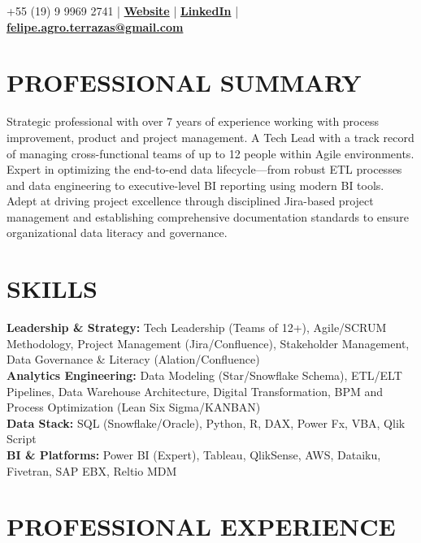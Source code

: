 \documentclass[9pt, letterpaper]{article}
\begin{document}
	\pagestyle{empty}
	
	 \hfill +55 (19) 9 9969 2741 | \href{https://feliperamiresterrazas.github.io/professionalwebsite/}{\textbf{Website}} | \href{https://www.linkedin.com/in/felipe-ramires-terrazas/}{\textbf{LinkedIn}} |
 \\
	 \hfill 	\href{mailto:felipe.agro.terrazas@gmail.com}{\textbf{felipe.agro.terrazas@gmail.com}}  
	
	\section*{PROFESSIONAL SUMMARY}
	\noindent Strategic professional with over 7 years of experience working with process improvement, product and project management. A Tech Lead with a track record of managing cross-functional teams of up to 12 people within Agile environments. Expert in optimizing the end-to-end data lifecycle—from robust ETL processes and data engineering to executive-level BI reporting using modern BI tools. Adept at driving project excellence through disciplined Jira-based project management and establishing comprehensive documentation standards to ensure organizational data literacy and governance.
	
	\section*{SKILLS}
	\noindent \textbf{Leadership \& Strategy:} Tech Leadership (Teams of 12+), Agile/SCRUM Methodology, Project Management (Jira/Confluence), Stakeholder Management, Data Governance \& Literacy (Alation/Confluence) \\
	\noindent \textbf{Analytics Engineering:} Data Modeling (Star/Snowflake Schema), ETL/ELT Pipelines, Data Warehouse Architecture, Digital Transformation, BPM and Process Optimization (Lean Six Sigma/KANBAN) \\
	\noindent \textbf{Data Stack:} SQL (Snowflake/Oracle), Python, R, DAX, Power Fx, VBA, Qlik Script \\
	\noindent \textbf{BI \& Platforms:} Power BI (Expert), Tableau, QlikSense, AWS, Dataiku, Fivetran, SAP EBX, Reltio MDM


	\section*{PROFESSIONAL EXPERIENCE}
	
\end{document}
